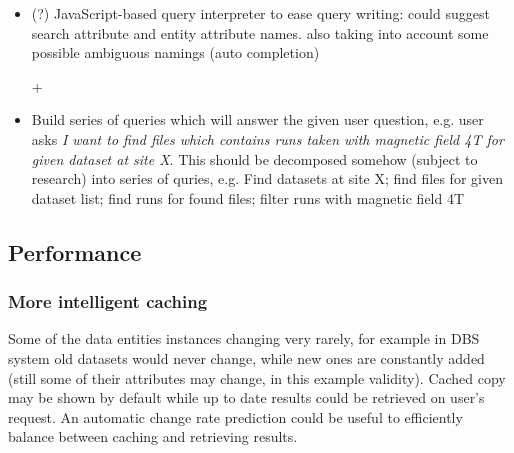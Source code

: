 \begin{itemize}
\begin{itemize}
\item making use of direct access to database {\color{red}(if available; in theory)}
\begin{itemize}
\item one could do incremental indexing of a target database  \footnote{E.g. an inverted index of values in Oracle/MySQL DB tables can be built to keep the list of possible terms. For instance, Sphinx full text search engine can access DBs directly and also supports incremental indexing but it needs a bit of manual configuration {http://sphinxsearch.com/docs/current.html\#delta-updates} }, then try to map database table columns into API parameters (manually or even automatically by applying some of Data Integration approaches)
\item then this index + mapping could be used to improve the keyword search (better mapping from keywords to API inputs) or even structured search (e.g. query cleaning/term auto-completion)
\item problem: the owners of services may not want to provide direct access to DB because of no trust, security or performance issues
\item may need to exclude very large tables
\end{itemize}
	\end{itemize}
\item (?) JavaScript-based query interpreter to ease query writing: could suggest search attribute and entity attribute names. also taking into account some possible ambiguous namings (auto completion)

+\item {\color{green} Build series of queries which will answer the given user question, e.g. user asks {\it I want to find files which contains runs taken with magnetic field 4T for given dataset at site X}. This should be decomposed somehow (subject to research) into series of quries, e.g. Find datasets at site X; find files for given dataset list; find runs for found files; filter runs with magnetic field 4T}
 		
	
\end{itemize}


\subsection{Performance}



\subsubsection*{More intelligent caching}
Some of the data entities instances changing very rarely, for example in DBS system old datasets would never change, while new ones are constantly added (still some of their attributes may change, in this example validity). 
%
Cached copy may be shown by default while up to date results could be retrieved on user's request. An automatic change rate prediction could be useful to efficiently balance between caching and retrieving results.

